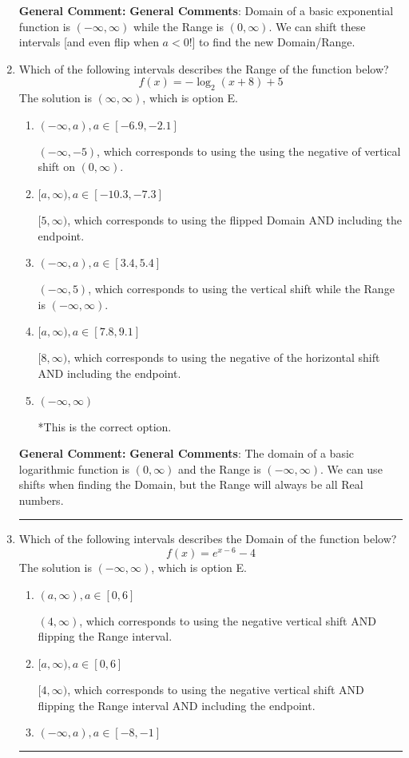 \documentclass{extbook}[14pt]
\newcommand{\litem}[1]{\item #1

\rule{\textwidth}{0.4pt}}
\begin{document}
\begin{enumerate}
{\textbf{General Comment:} \textbf{General Comments}: Domain of a basic exponential function is $(-\infty, \infty)$ while the Range is $(0, \infty)$. We can shift these intervals [and even flip when $a<0$!] to find the new Domain/Range.
}
\litem{
Which of the following intervals describes the Range of the function below?
\[ f(x) = -\log_2{(x+8)}+5 \]The solution is \( (\infty, \infty) \), which is option E.\begin{enumerate}[label=\Alph*.]
\item \( (-\infty, a), a \in [-6.9, -2.1] \)

$(-\infty, -5)$, which corresponds to using the using the negative of vertical shift on $(0, \infty)$.
\item \( [a, \infty), a \in [-10.3, -7.3] \)

$[5, \infty)$, which corresponds to using the flipped Domain AND including the endpoint.
\item \( (-\infty, a), a \in [3.4, 5.4] \)

$(-\infty, 5)$, which corresponds to using the vertical shift while the Range is $(-\infty, \infty)$.
\item \( [a, \infty), a \in [7.8, 9.1] \)

$[8, \infty)$, which corresponds to using the negative of the horizontal shift AND including the endpoint.
\item \( (-\infty, \infty) \)

*This is the correct option.
\end{enumerate}

\textbf{General Comment:} \textbf{General Comments}: The domain of a basic logarithmic function is $(0, \infty)$ and the Range is $(-\infty, \infty)$. We can use shifts when finding the Domain, but the Range will always be all Real numbers.
}
\litem{
Which of the following intervals describes the Domain of the function below?
\[ f(x) = e^{x-6}-4 \]The solution is \( (-\infty, \infty) \), which is option E.\begin{enumerate}[label=\Alph*.]
\item \( (a, \infty), a \in [0, 6] \)

$(4, \infty)$, which corresponds to using the negative vertical shift AND flipping the Range interval.
\item \( [a, \infty), a \in [0, 6] \)

$[4, \infty)$, which corresponds to using the negative vertical shift AND flipping the Range interval AND including the endpoint.
\item \( (-\infty, a), a \in [-8, -1] \)


\end{enumerate}}
\end{enumerate}
\end{document}

